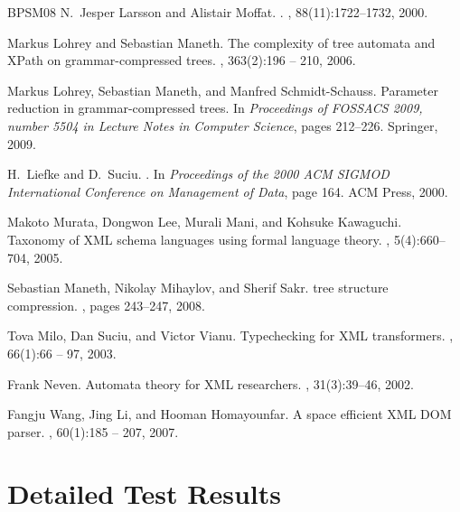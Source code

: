 \documentclass[12pt]{llncs}
\begin{document}
\begin{thebibliography}{BPSM{\etalchar{+}}08}
N.~Jesper Larsson and Alistair Moffat.
.
, 88(11):1722--1732, 2000.

Markus Lohrey and Sebastian Maneth.
\newblock The complexity of tree automata and {XP}ath on grammar-compressed
  trees.
, 363(2):196 -- 210, 2006.

Markus Lohrey, Sebastian Maneth, and Manfred Schmidt-Schauss.
\newblock Parameter reduction in grammar-compressed trees.
\newblock In {\em Proceedings of FOSSACS 2009, number 5504 in Lecture Notes in
  Computer Science}, pages 212--226. Springer, 2009.

H.~Liefke and D.~Suciu.
.
\newblock In {\em Proceedings of the 2000 ACM SIGMOD International Conference
  on Management of Data}, page 164. ACM Press, 2000.

Makoto Murata, Dongwon Lee, Murali Mani, and Kohsuke Kawaguchi.
\newblock Taxonomy of {XML} schema languages using formal language theory.
, 5(4):660--704, 2005.

Sebastian Maneth, Nikolay Mihaylov, and Sherif Sakr.
 tree structure compression.
, pages 243--247, 2008.

Tova Milo, Dan Suciu, and Victor Vianu.
\newblock Typechecking for {XML} transformers.
, 66(1):66 -- 97, 2003.

Frank Neven.
\newblock Automata theory for {XML} researchers.
, 31(3):39--46, 2002.

Fangju Wang, Jing Li, and Hooman Homayounfar.
\newblock A space efficient {XML} {DOM} parser.
, 60(1):185 -- 207, 2007.

\end{thebibliography}


\newpage

\appendix

\section{Detailed Test Results}\label{ch:detailedResults}
\end{document}
